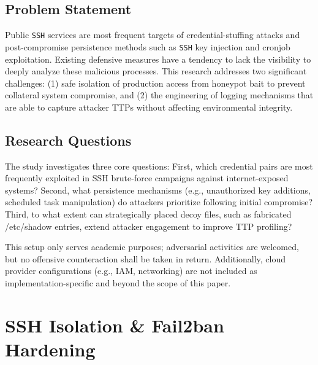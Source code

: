 \documentclass{cls/ULBreport}
\begin{document}
        \subsection{Problem Statement} 
        Public \texttt{SSH} services are most frequent targets of credential-stuffing attacks and post-compromise persistence methods such as \texttt{SSH} key injection and cronjob exploitation. Existing defensive measures have a tendency to lack the visibility to deeply analyze these malicious processes. This research addresses two significant challenges: (1) safe isolation of production access from honeypot bait to prevent collateral system compromise, and (2) the engineering of logging mechanisms that are able to capture attacker TTPs without affecting environmental integrity.

        \subsection{Research Questions}
        The study investigates three core questions: First, which credential pairs are most frequently exploited in SSH brute-force campaigns against internet-exposed systems? Second, what persistence mechanisms (e.g., unauthorized key additions, scheduled task manipulation) do attackers prioritize following initial compromise? Third, to what extent can strategically placed decoy files, such as fabricated /etc/shadow entries, extend attacker engagement to improve TTP profiling?

    \begin{tcolorbox}[  
        colback=red!5!white,  
        colframe=red!75!black,  
        title={\textbf{\textcolor{black}{Security Disclaimer}}},
        fontupper=\small,  
        sharp corners  
    ]  
    This setup only serves academic purposes; adversarial activities are welcomed, but no offensive counteraction shall be taken in return. Additionally, cloud provider configurations (e.g., IAM, networking) are not included as implementation-specific and beyond the scope of this paper.  
    \end{tcolorbox}  

        
    \section{SSH Isolation \& Fail2ban Hardening}
\end{document}
